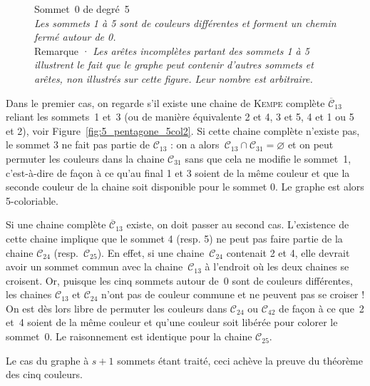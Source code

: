 \documentclass[french]{report}
\begin{document}
\begin{figure}
	
	\caption{Sommet~0 de degré~5\\\footnotesize\textit{Les sommets 1 à 5 sont de couleurs différentes et forment un chemin fermé autour de 0.}\\\footnotesize{Remarque · \textit{Les arêtes incomplètes partant des sommets 1 à 5 illustrent le fait que le graphe peut contenir d'autres sommets et arêtes, non illustrés sur cette figure. Leur nombre est arbitraire.}}}
	\label{fig:5_pentagone_5col}
\end{figure}

Dans le premier cas, on regarde s'il existe une chaine de \textsc{Kempe} complète $\overline{\mathcal{C}}_{13}$ reliant les sommets~1 et~3 (ou de manière équivalente 2 et 4, 3 et 5, 4 et 1 ou 5 et 2), %
voir Figure~\ref{fig:5_pentagone_5col2}. %
Si cette chaine complète n'existe pas, le sommet 3 ne fait pas partie de $\mathcal{C}_{13}$ : on a alors~$\mathcal{C}_{13}\cap\mathcal{C}_{31}=\varnothing$ et on peut permuter les couleurs dans la chaine $\mathcal{C}_{31}$ sans que cela ne modifie le sommet~1, c'est-à-dire de façon à ce qu'au final 1 et 3 soient de la même couleur et que la seconde couleur de la chaine soit disponible pour le sommet 0. Le graphe est alors 5-coloriable.

Si une chaine complète $\overline{\mathcal{C}}_{13}$ existe, on doit passer au second cas. L'existence de cette chaine implique que le sommet 4 (resp. 5) ne peut pas faire partie de la chaine $\mathcal{C}_{24}$ (resp.~$\mathcal{C}_{25}$). En effet, si une chaine~$\mathcal{C}_{24}$ contenait 2 et 4, elle devrait avoir un sommet commun avec la chaine~$\mathcal{C}_{13}$ à l'endroit où les deux chaines se croisent. Or, puisque les cinq sommets autour de~0 sont de couleurs différentes, les chaines $\mathcal{C}_{13}$ et $\mathcal{C}_{24}$ n'ont pas de couleur commune et ne peuvent pas se croiser ! On est dès lors libre de permuter les couleurs dans $\mathcal{C}_{24}$ ou $\mathcal{C}_{42}$ de façon à ce que~2 et~4 soient de la même couleur et qu'une couleur soit libérée pour colorer le sommet~0. Le raisonnement est identique pour la chaine $\mathcal{C}_{25}$.

Le cas du graphe à $s+1$ sommets étant traité, ceci achève la preuve du théorème des cinq couleurs.
\end{document}
